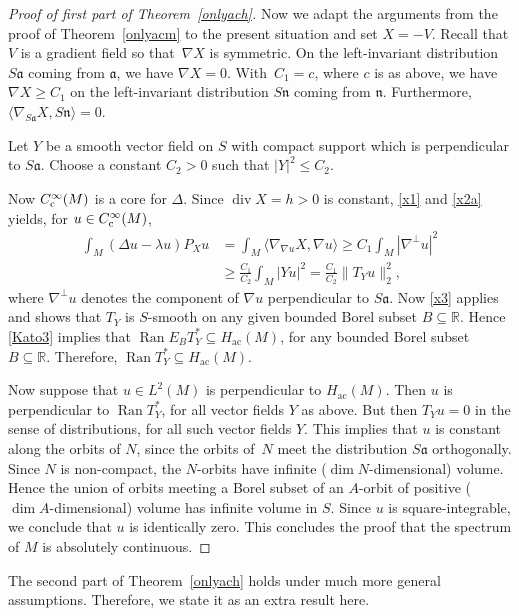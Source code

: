 \documentclass[10pt,a4paper]{amsart}
\numberwithin{equation}{section}
\DeclareMathOperator{\diver}{div}
\DeclareMathOperator{\ran}{Ran}
\def\ac{\mathrm{ac}}
\def\R{\mathbb R}
\begin{document}
\begin{proof}[Proof of first part of Theorem~\ref{onlyach}]
Now we adapt the arguments from the proof of Theorem~\ref{onlyacm} to the present situation and set $X=-V$.
Recall that $V$ is a gradient field so that~$\nabla X$ is symmetric.
On the left-invariant distribution $S\mathfrak a$ coming from $\mathfrak a$, we have $\nabla X=0$.
With~$C_1=c$, where $c$ is as above, we have $\nabla X\ge C_1$
on the left-invariant distribution $S\mathfrak n$ coming from $\mathfrak n$.
Furthermore, $\langle\nabla_{S\mathfrak a}X,S\mathfrak n\rangle=0$.

Let $Y$ be a smooth vector field on $S$ with compact support which is perpendicular to $S\mathfrak a$.
Choose a constant $C_2>0$ such that $|Y|^2\le C_2$.

Now $C^\infty_{\rm c}(M)$ is a core for $\Delta$.
Since $\diver X=h>0$ is constant, \eqref{x1} and \eqref{x2a} yields, for $u\in C^\infty_{\rm c}(M)$,
\begin{align*}
 \int_M (\Delta u-\lambda u) P_Xu
 &= \int_M \langle\nabla_{\nabla u}X,\nabla u\rangle \ge C_1 \int_M|\nabla^\bot u|^2 \\
 &\ge \frac{C_1}{C_2}\int_M|Yu|^2 = \frac{C_1}{C_2}\|T_Yu\|_2^2,
\end{align*}
where $\nabla^\bot u$ denotes the component of $\nabla u$ perpendicular to $S\mathfrak a$.
Now \eqref{x3} applies and shows that $T_Y$ is $S$-smooth on any given bounded Borel subset $B\subseteq\R$.
Hence \eqref{Kato3} implies that $\ran E_BT_Y^*\subseteq H_{\ac}(M)$,
for any bounded Borel subset $B\subseteq\R$.
Therefore, $\ran T_Y^*\subseteq H_{\ac}(M)$.

Now suppose that $u\in L^2(M)$ is perpendicular to $H_{\ac}(M)$.
Then $u$ is perpendicular to $\ran T_Y^*$, for all vector fields $Y$ as above.
But then $T_Yu=0$ in the sense of distributions, for all such vector fields $Y$.
This implies that $u$ is constant along the orbits of $N$,
since the orbits of~$N$ meet the distribution $S\mathfrak a$ orthogonally.
Since $N$ is non-compact, the $N$-orbits have infinite ($\dim N$-dimensional) volume.
Hence the union of orbits meeting a Borel subset of an $A$-orbit of positive ($\dim A$-dimensional) volume
has infinite volume in $S$.
Since $u$ is square-integrable, we conclude that $u$ is identically zero.
This concludes the proof that the spectrum of $M$ is absolutely continuous.
\end{proof}


The second part of Theorem~\ref{onlyach} holds under much more general assumptions.
Therefore, we state it as an extra result here.
\end{document}

